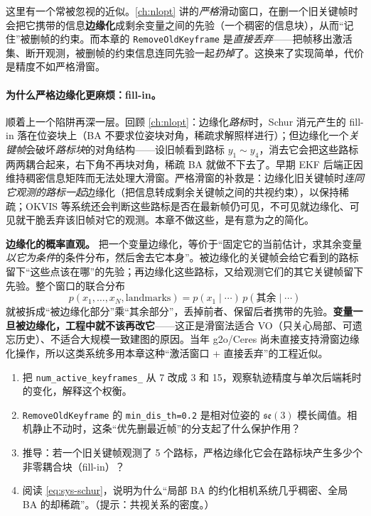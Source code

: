 \begin{pitfall}
这里有一个常被忽视的近似。\cref{ch:nlopt} 讲的\emph{严格}滑动窗口，在删一个旧关键帧时会把它携带的信息\textbf{边缘化}成剩余变量之间的先验（一个稠密的信息块），从而“记住”被删帧的约束。而本章的 \texttt{RemoveOldKeyframe} 是\emph{直接丢弃}——把帧移出激活集、断开观测，被删帧的约束信息连同先验一起\emph{扔掉}了。这换来了实现简单，代价是精度不如严格滑窗。
\end{pitfall}

\paragraph{为什么严格边缘化更麻烦：fill-in。}
顺着上一个陷阱再深一层。回顾 \cref{ch:nlopt}：边缘化\emph{路标}时，Schur 消元产生的 fill-in 落在位姿块上（BA 不要求位姿块对角，稀疏求解照样进行）；但边缘化一个\emph{关键帧}会破坏\emph{路标块}的对角结构——设旧帧看到路标 $y_1\sim y_4$，消去它会把这些路标两两耦合起来，右下角不再块对角，稀疏 BA 就做不下去了。早期 EKF 后端正因维持稠密信息矩阵而无法处理大滑窗。严格滑窗的补救是：边缘化旧关键帧时\emph{连同它观测的路标一起}边缘化（把信息转成剩余关键帧之间的共视约束），以保持稀疏；OKVIS 等系统还会判断这些路标是否在最新帧仍可见，不可见就边缘化、可见就干脆丢弃该旧帧对它的观测。本章不做这些，是有意为之的简化。

\begin{insight}
\textbf{边缘化的概率直观。}
把一个变量边缘化，等价于“固定它的当前估计，求其余变量\emph{以它为条件}的条件分布，然后舍去它本身”。被边缘化的关键帧会给它看到的路标留下“这些点该在哪”的先验；再边缘化这些路标，又给观测它们的其它关键帧留下先验。整个窗口的联合分布
\begin{equation}
p(x_1,\dots,x_N,\text{landmarks})=p(x_1\mid\cdots)\,p(\text{其余}\mid\cdots)
\label{eq:sys-marg}
\end{equation}
就被拆成“被边缘化部分”乘“其余部分”，丢掉前者、保留后者携带的先验。\textbf{变量一旦被边缘化，工程中就不该再改它}——这正是滑窗法适合 VO（只关心局部、可遗忘历史）、不适合大规模一致建图的原因。当年 g2o/Ceres 尚未直接支持滑窗边缘化操作，所以这类系统多用本章这种“激活窗口 + 直接丢弃”的工程近似。
\end{insight}

\begin{practice}[练习]
\begin{enumerate}
  \item 把 \texttt{num\_active\_keyframes\_} 从 7 改成 3 和 15，观察轨迹精度与单次后端耗时的变化，解释这个权衡。
  \item \texttt{RemoveOldKeyframe} 的 \texttt{min\_dis\_th=0.2} 是相对位姿的 $\mathfrak{se}(3)$ 模长阈值。相机静止不动时，这条“优先删最近帧”的分支起了什么保护作用？
  \item 推导：若一个旧关键帧观测了 5 个路标，严格边缘化它会在路标块产生多少个非零耦合块（fill-in）？
  \item 阅读 \cref{eq:sys-schur}，说明为什么“局部 BA 的约化相机系统几乎稠密、全局 BA 的却稀疏”。（提示：共视关系的密度。）
\end{enumerate}
\end{practice}

